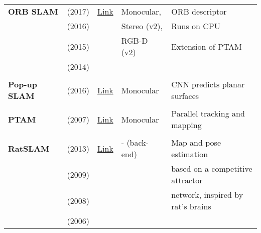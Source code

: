 \documentclass[a4paper,12pt]{scrartcl}
\begin{document}
{\begin{longtable}{l|l|l|l|l}
    \textbf{ORB SLAM}      & \cite{Mur-Artal2017} (2017)       & \href{https://github.com/raulmur/ORB_SLAM2}{Link}                  &  Monocular,           & ORB descriptor\\
                           & \cite{Mur-Artal2016a} (2016)      &                                                                    &  Stereo (v2),         & Runs on CPU\\
                           & \cite{Mur-Artal2015} (2015)       &                                                                    &  RGB-D (v2)           & Extension of PTAM\\
                           & \cite{Mur-Artal2014} (2014)       &                                                                    &                       &\\
                           &                                   &                                                                    &                       &\\
    \textbf{Pop-up SLAM}   & \cite{Yang2016} (2016)            & {\href{https://github.com/shichaoy/pop_up_image}{Link}}            & Monocular             & CNN predicts planar surfaces\\
                           &                                   &                                                                    &                       &\\
    \textbf{PTAM}          & \cite{Klein2007} (2007)           & {\href{https://github.com/Oxford-PTAM/PTAM-GPL}{Link}}             & Monocular             & Parallel tracking and mapping\\
                           &                                   &                                                                    &                       &\\
    \textbf{RatSLAM}       & \cite{Ball2013} (2013)            & {\href{https://github.com/davidmball/ratslam}{Link}}               & - (back-end)          & Map and pose estimation\\
                           & \cite{Maddern2009} (2009)         &                                                                    &                       & based on a competitive attractor\\
                           & \cite{Milford2008} (2008)         &                                                                    &                       & network, inspired by rat's brains\\
                           & \cite{Milford2006} (2006)         &                                                                    &                       &\\

\end{longtable}}
\end{document}
